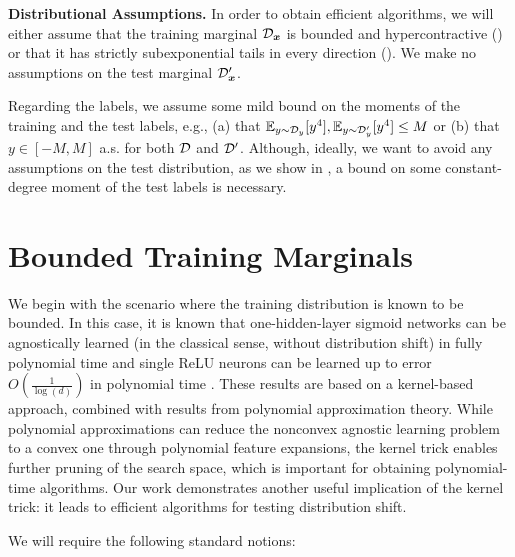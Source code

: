 \documentclass[11pt]{article} %
\numberwithin{equation}{section}
\begin{document}
\noindent\textbf{Distributional Assumptions.} In order to obtain efficient algorithms, we will either assume that the training marginal ${\mathcal{D}}_{{\bm{x}}}$ is bounded and hypercontractive () or that it has strictly subexponential tails in every direction (). We make no assumptions on the test marginal ${\mathcal{D}}_{{\bm{x}}}'$.

Regarding the labels, we assume some mild bound on the moments of the training and the test labels, e.g., (a) that $\mathbb{E}_{y\sim{\mathcal{D}}_y}[y^4], \mathbb{E}_{y\sim{\mathcal{D}}'_y}[y^4] \le M$ or (b) that $y\in[-M,M]$ a.s. for both ${\mathcal{D}}$ and ${\mathcal{D}}'$. Although, ideally, we want to avoid any assumptions on the test distribution, as we show in , a bound on some constant-degree moment of the test labels is necessary.

\section{Bounded Training Marginals}\label{section:bounded}

We begin with the scenario where the training distribution is known to be bounded. In this case, it is known that one-hidden-layer sigmoid networks can be agnostically learned (in the classical sense, without distribution shift) in fully polynomial time and single ReLU neurons can be learned up to error $O(\frac{1}{\log(d)})$ in polynomial time \cite{reliable_goel2017}. These results are based on a kernel-based approach, combined with results from polynomial approximation theory. While polynomial approximations can reduce the nonconvex agnostic learning problem to a convex one through polynomial feature expansions, the kernel trick enables further pruning of the search space, which is important for obtaining polynomial-time algorithms. Our work demonstrates another useful implication of the kernel trick: it leads to efficient algorithms for testing distribution shift.

We will require the following standard notions:
\end{document}
